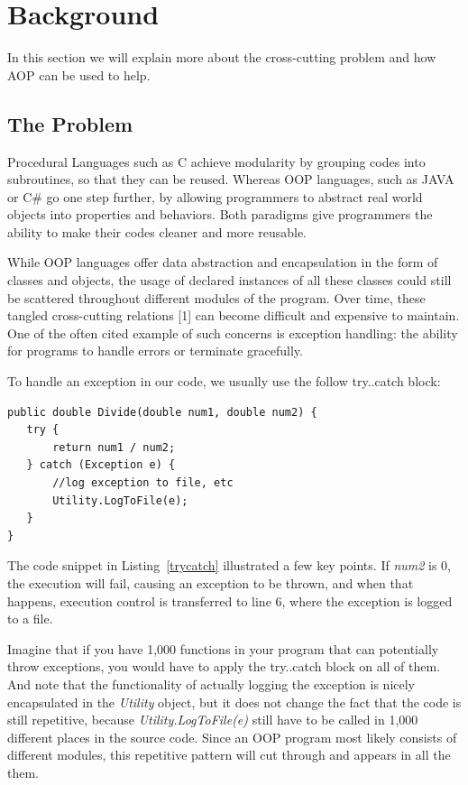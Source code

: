 \section{Background}
In this section we will explain more about the cross-cutting problem and how AOP can be used to help.

\subsection{The Problem}
Procedural Languages such as C achieve modularity by grouping codes into subroutines, so that they can be reused. Whereas OOP languages, such as JAVA or C\# go one step further, by allowing programmers to abstract real world objects into properties and behaviors. Both paradigms give programmers the ability to make their codes cleaner and more reusable.

While OOP languages offer data abstraction and encapsulation in the form of classes and objects, the usage of declared instances of all these classes could still be scattered throughout different modules of the program. Over time, these tangled cross-cutting relations [1] can become difficult and expensive to maintain. One of the often cited example of such concerns is exception handling: the ability for programs to handle errors or terminate gracefully.

To handle an exception in our code, we usually use the follow try..catch block:

\begin{lstlisting}[caption={try..catch pattern}, label=trycatch]
public double Divide(double num1, double num2) {
   try {
       return num1 / num2;
   } catch (Exception e) {
       //log exception to file, etc
       Utility.LogToFile(e);
   }
}
\end{lstlisting}

The code snippet in Listing~\ref{trycatch} illustrated a few key points. If {\em num2} is 0, the execution will fail, causing an exception to be thrown, and when that happens, execution control is transferred to line 6, where the exception is logged to a file. 

Imagine that if you have 1,000 functions in your program that can potentially throw exceptions, you would have to apply the try..catch block on all of them. And note that the functionality of actually logging the exception is nicely encapsulated in the {\em Utility} object, but it does not change the fact that the code is still repetitive, because {\em Utility.LogToFile(e)} still have to be called in 1,000 different places in the source code. Since an OOP program most likely consists of different modules, this repetitive pattern will cut through and appears in all the them.

